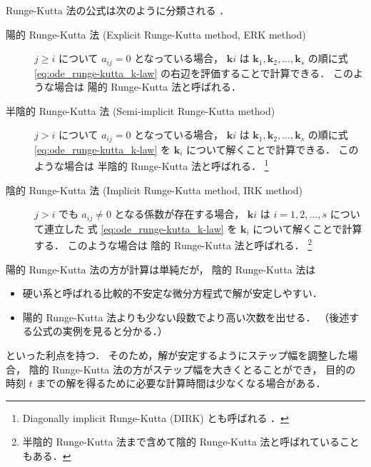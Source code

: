 Runge-Kutta 法の公式は次のように分類される \cite{Mitsui1993}．

\begin{description}
    \item[陽的 Runge-Kutta 法 (Explicit Runge-Kutta method, ERK method)]
          $j \ge i$ について $a_{ij} = 0$ となっている場合，
          $\bm{k}i$ は $\bm{k}_1, \bm{k}_2, \ldots, \bm{k}_s$
          の順に式 \eqref{eq:ode_runge-kutta_k-law} の右辺を評価することで計算できる．
          このような場合は
          陽的 Runge-Kutta 法と呼ばれる．
    \item[半陰的 Runge-Kutta 法 (Semi-implicit Runge-Kutta method)]
          $j > i$ について $a_{ij} = 0$ となっている場合，
          $\bm{k}i$ は $\bm{k}_1, \bm{k}_2, \ldots, \bm{k}_s$
          の順に式 \eqref{eq:ode_runge-kutta_k-law} を $\bm{k}_i$ について解くことで計算できる．
          このような場合は
          半陰的 Runge-Kutta 法と呼ばれる．
          \footnote{Diagonally implicit Runge-Kutta (DIRK) とも呼ばれる \cite{Hairer1991}．}
    \item[陰的 Runge-Kutta 法 (Implicit Runge-Kutta method, IRK method)]
          $j > i$ でも $a_{ij} \neq 0$ となる係数が存在する場合，
          $\bm{k}i$ は $i = 1, 2, \ldots, s$ について連立した
          式 \eqref{eq:ode_runge-kutta_k-law} を $\bm{k}_i$ について解くことで計算する．
          このような場合は
          陰的 Runge-Kutta 法と呼ばれる．
          \footnote{半陰的 Runge-Kutta 法まで含めて陰的 Runge-Kutta 法と呼ばれていることもある．}
\end{description}

陽的 Runge-Kutta 法の方が計算は単純だが，
陰的 Runge-Kutta 法は

\begin{itemize}
    \item {} 硬い系と呼ばれる比較的不安定な微分方程式で解が安定しやすい．
    \item 陽的 Runge-Kutta 法よりも少ない段数でより高い次数を出せる．
          （後述する公式の実例を見ると分かる．）
\end{itemize}

といった利点を持つ．
そのため，解が安定するようにステップ幅を調整した場合，
陰的 Runge-Kutta 法の方がステップ幅を大きくとることができ，
目的の時刻 $t$ までの解を得るために必要な計算時間は少なくなる場合がある．

